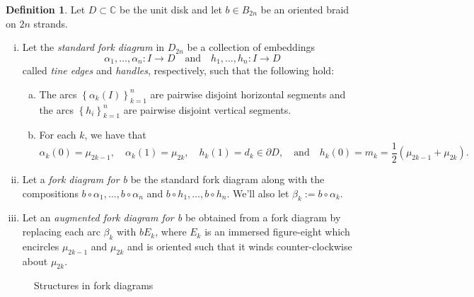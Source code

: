 \documentclass[11pt]{article}
\theoremstyle{plain} \newtheorem{thm}{Theorem}[subsection]
\theoremstyle{plain} \newtheorem{cor}[thm]{Corollary}
\theoremstyle{plain} \newtheorem{prop}[thm]{Proposition}
\theoremstyle{plain} \newtheorem{conj}[thm]{Conjecture}
\theoremstyle{plain} \newtheorem{lem}[thm]{Lemma}
\theoremstyle{definition} \newtheorem{df}[thm]{Definition}
\theoremstyle{remark} \newtheorem{rmk}[thm]{Remark}
\theoremstyle{remark} \newtheorem{obs}[thm]{Observation}
\newcommand{\Bn}{B_{2n}}
\numberwithin{equation}{section}
\begin{document}
\begin{df}\label{defforks}
Let $D \subset \mathbb{C}$ be the unit disk and let $b \in \Bn$ be an oriented braid on $2n$ strands.  
\begin{enumerate}[(i)]
\item Let the \emph{standard fork diagram} in $D_{2n}$ be a collection of embeddings
\begin{equation*}
\alpha_{1}, \ldots ,\alpha_{n}:I \rightarrow D \quad \text{and} \quad h_{1}, \ldots , h_{n}:I \rightarrow D
\end{equation*}
called \emph{tine edges} and \emph{handles}, respectively, such that the following hold:
\begin{enumerate}[(a)]
\item The arcs $\left\{\alpha_{k}(I) \right\}_{k=1}^n$ are pairwise disjoint horizontal segments and the arcs $\left\{h_{i}\right\}_{k=1}^n$ are pairwise disjoint vertical segments.
\item For each $k$, we have that
$$\alpha_{k}(0) = \mu_{2k-1}, \quad \alpha_{k}(1) = \mu_{2k}, \quad h_{k}(1) = d_{k} \in \partial D, \quad \text{and} \quad h_{k}(0) = m_{k} = \frac{1}{2}(\mu_{2k-1} + \mu_{2k}).$$
\end{enumerate}
\item Let a \emph{fork diagram for b} be the standard fork diagram along with the compositions $b \circ \alpha_{1}, \ldots, b \circ \alpha_{n}$ and $b \circ h_{1}, \ldots, b \circ h_{n}$.  We'll also let $\beta_{k} := b \circ \alpha_{k}$.
\item Let an \emph{augmented fork diagram for b} be obtained from a fork diagram by replacing each arc $\beta_{k}$ with $bE_{k}$, where $E_{k}$ is an immersed figure-eight which encircles $\mu_{2k-1}$ and $\mu_{2k}$ and is oriented such that it winds counter-clockwise about $\mu_{2k}$.
\end{enumerate}
\end{df}

\begin{figure}[h!]
\centering
{}\quad
{}
\caption{Structures in fork diagrams \label{fig:standardfork}}
\end{figure}
\end{document}
